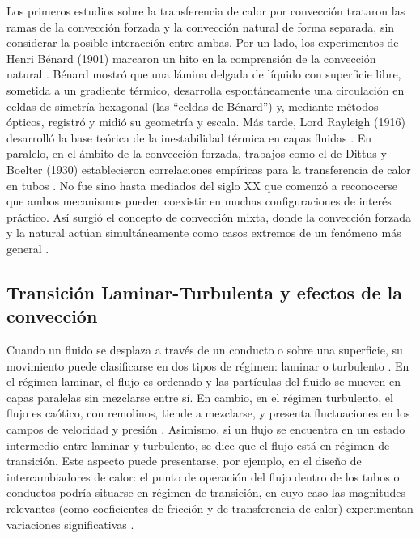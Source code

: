Los primeros estudios sobre la transferencia de calor por convección trataron las ramas de la convección forzada y la convección natural de forma separada, sin considerar \linebreak la posible interacción entre ambas. Por un lado, los experimentos de Henri Bénard (1901) marcaron un hito en la comprensión de la convección natural \cite{benard1901}. Bénard mostró que una lámina delgada de líquido con superficie libre, sometida a un gradiente térmico, desarrolla espontáneamente una circulación en celdas de simetría hexagonal (las ``celdas de Bénard'') y, mediante métodos ópticos, registró y midió su geometría y escala. Más tarde, Lord Rayleigh (1916) desarrolló la base teórica de la inestabilidad térmica en capas fluidas \cite{rayleigh1916}. En paralelo, en el ámbito de la convección forzada, trabajos como el de Dittus y Boelter (1930) establecieron correlaciones empíricas para la transferencia de calor en tubos \cite{dittus1930}. No fue sino hasta mediados del siglo XX que comenzó a reconocerse que ambos mecanismos pueden coexistir en muchas configuraciones de interés práctico. Así surgió el concepto de convección mixta, donde la convección forzada y la natural actúan simultáneamente como casos extremos de un fenómeno más general \cite{metais1964}. 

\subsection*{Transición Laminar-Turbulenta y efectos de la convección}

Cuando un fluido se desplaza a través de un conducto o sobre una superficie, su movimiento puede clasificarse en dos tipos de régimen: laminar o turbulento \cite{white}. En el régimen laminar, el flujo es ordenado y las partículas del fluido se mueven en capas paralelas sin mezclarse entre sí. En cambio, en el régimen turbulento, el flujo es caótico, con remolinos, tiende a mezclarse, y presenta fluctuaciones en los campos de velocidad y presión \cite{kundu}. Asimismo, si un flujo se encuentra en un estado intermedio entre laminar y turbulento, se dice que el flujo está en régimen de transición. Este aspecto puede presentarse, por ejemplo, en el diseño de \linebreak intercambiadores de calor: el punto de operación del flujo dentro de los tubos o conductos podría situarse en régimen de transición, en cuyo caso las magnitudes relevantes (como coeficientes de fricción y de transferencia de calor) experimentan variaciones significativas \cite{ghajar2019heat}. 

